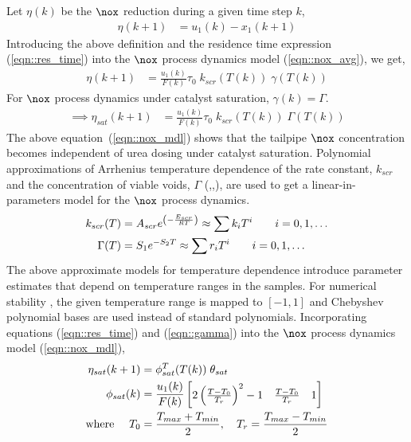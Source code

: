 Let $\eta(k)$ be the $\nox$ reduction during a given time step $k$,
\begin{align}
        \eta (k+1) & = u_1(k) - x_1(k+1)
\end{align}
Introducing the above definition and the residence time expression (\ref{eqn::res_time}) into the $\nox$ process dynamics model (\ref{eqn::nox_avg}), we get,
\begin{align}
        \eta (k+1) & =   \frac{u_1(k)}{F(k)} \tau_0 \; k_{scr}(T(k)) \; \gamma (T(k)) \label{eqn::flow_scaled_nox_eff}
\end{align}
For $\nox$ process dynamics under catalyst saturation, $\gamma(k) = \Gamma$.
\begin{align}
        \implies \eta_{sat} (k+1) & =  \frac{u_1(k)}{F(k)} \tau_0 \; k_{scr}(T(k)) \; \Gamma (T(k))
        \label{eqn::nox_mdl}
\end{align}
The above equation~(\ref{eqn::nox_mdl}) shows that the tailpipe $\nox$ concentration becomes independent of urea dosing under catalyst saturation. Polynomial approximations of Arrhenius temperature dependence of the rate constant, $k_{scr}$ and the concentration of viable voids, $\Gamma$ (\cite{nova2014urea},\cite{ciardelli2004scr},\cite{joo2008study}), are used to get a linear-in-parameters model for the $\nox$ process dynamics.
\begin{align}
        k_{scr}(T) & = A_{scr} e^{\left( -\frac{E_{scr}}{RT} \right)} \approx \sum k_i T^i  \qquad i = 0, 1, \hdots
        \label{eqn::rate_const}                                                                           \\
        \Gamma(T)  & = S_1 e^{-S_2 T} \approx \sum r_i T^i \qquad i = 0, 1, \hdots
        \label{eqn::gamma}
\end{align}
The above approximate models for temperature dependence introduce parameter estimates that depend on temperature ranges
in the samples. For numerical stability \cite{press2003numerical}, the given temperature range is mapped to $[-1,1]$ and
Chebyshev polynomial bases \cite{trefethen2019approximation} are used instead of standard polynomials. Incorporating
equations (\ref{eqn::res_time}) and (\ref{eqn::gamma}) into the $\nox$ process dynamics model (\ref{eqn::nox_mdl}),
\begin{align}
        \eta_{sat} (k+1)        & = \phi_{sat}^T(T(k)) \; \theta_{sat}
        \label{eqn::regression}                                                                                                          \\
        \phi_{sat} (k)          & = \frac{u_1(k)}{F(k)} \begin{bmatrix} 2\left( \frac{T-T_0}{T_r} \right)^2-1                         & \frac{T-T_0}{T_r} & 1 \end{bmatrix}
        \label{eqn::phi_def}                                                                                                             \\
        \text{where } \quad T_0 & = \frac{T_{max} + T_{min}}{2}, \quad T_r = \frac{T_{max} - T_{min}}{2} \notag
\end{align}
